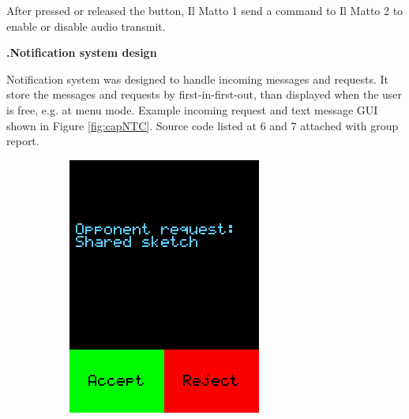 \documentclass[a4paper,notitlepage,10pt]{report}
\newcommand{\tab}{\hspace{0.75cm}}
\newcommand{\fontSubHeading}{\fontsize{10pt}{11pt}\selectfont}
\newcounter{sections}
\newcounter{subsections}[sections]
\begin{document}
\begin{multicols}{2}
After pressed or released the button, Il Matto 1 send a command to Il Matto 2 to enable or disable audio transmit.
\vspace{6pt}

\fontSubHeading
{}
\textbf{\thesections.\thesubsections\tab Notification system design}
\vspace{6pt}

Notification system was designed to handle incoming messages and requests. It store the messages and requests by first-in-first-out, than displayed when the user is free, e.g. at menu mode. Example incoming request and text message GUI shown in Figure \ref{fig:capNTC}. Source code listed at 6 and 7 attached with group report.

\begin{figure}[H]
	\centering
	\begin{subfigure}[b]{0.4\columnwidth}
		\includegraphics[width=\textwidth]{cap_req}

\end{subfigure}
\end{figure}
\end{multicols}
\end{document}
